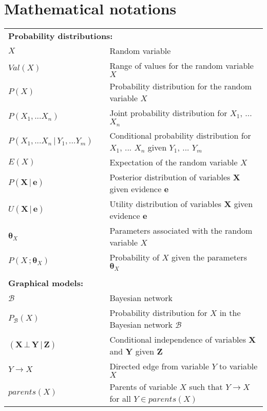 
\chapter*{Mathematical notations}
\thispagestyle{empty}

\begin{longtable}{lp{5mm}p{11cm}}
\multicolumn{3}{l}{\textbf{Probability distributions:}} \vspace{2mm} \\
$X$ && Random variable \\
$Val(X)$ && Range of values for the random variable $X$ \\
$P(X)$ && Probability distribution for the random variable $X$ \\
$P(X_1, ...X_n)$ && Joint probability distribution for $X_1$, ... $X_n$ \\
$P(X_1,...X_n \, | \, Y_1, ... Y_m)$ && Conditional probability distribution for $X_1$, ... $X_n$ given $Y_1$, ... $Y_m$  \\ 
$E(X)$ && Expectation of the random variable $X$ \\
 $P(\mathbf{X}  \, | \,  \mathbf{e})$ && Posterior distribution of variables $\mathbf{X}$ given evidence $\mathbf{e}$ \\ 
 $U(\mathbf{X}  \, | \,  \mathbf{e})$ && Utility distribution of variables $\mathbf{X}$ given evidence $\mathbf{e}$ \\ 
 $\boldsymbol\theta_{X}$ && Parameters associated with the random variable $X$ \\ 
 $P(X\,;\boldsymbol\theta_{X})$ && Probability of $X$ given the parameters $\boldsymbol\theta_{X}$ \\ 
 
&&  \vspace{0mm} \\
\multicolumn{3}{l}{\textbf{Graphical models:}} \vspace{2mm} \\
 $\mathcal{B}$ && Bayesian network \\
 $P_\mathcal{B}(X)$ && Probability distribution for $X$ in the Bayesian network $\mathcal{B}$ \\ 
$(\mathbf{X} \, \bot \, \mathbf{Y} \, | \, \mathbf{Z})$ && Conditional independence of variables $\mathbf{X} $ and $\mathbf{Y}$ given $\mathbf{Z}$ \\
$Y \rightarrow X$ && Directed edge from variable $Y$ to variable $X$ \\
$parents(X)$ && Parents of variable $X$ such that $Y \rightarrow X$ for all $Y\!\in\!parents(X)$ \\


\end{longtable}
